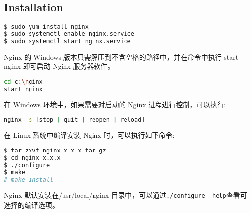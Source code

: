 \subsection{Installation}


\begin{lstlisting}[language=bash]
$ sudo yum install nginx
$ sudo systemctl enable nginx.service
$ sudo systemctl start nginx.service
\end{lstlisting}




Nginx 的 Windows 版本只需解压到不含空格的路径中，并在命令中执行 start nginx 即可启动 Nginx 服务器软件。


\begin{lstlisting}[language=bash]
cd c:\nginx
start nginx
\end{lstlisting}


在 Windows 环境中，如果需要对启动的 Nginx 进程进行控制，可以执行:

\begin{lstlisting}[language=bash]
nginx -s [stop | quit | reopen | reload]
\end{lstlisting}


在 Linux 系统中编译安装 Nginx 时，可以执行如下命令:

\begin{lstlisting}[language=bash]
$ tar zxvf nginx-x.x.x.tar.gz
$ cd nginx-x.x.x
$ ./configure
$ make
# make install
\end{lstlisting}



Nginx 默认安装在/usr/local/nginx 目录中，可以通过\texttt{./configure --help}查看可选择的编译选项。


\begin{lstlisting}[language=bash]

\end{lstlisting}


